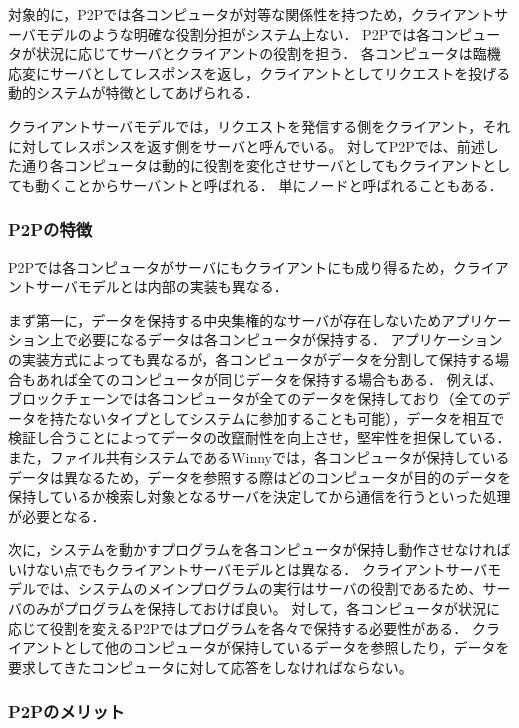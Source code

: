 対象的に，P2Pでは各コンピュータが対等な関係性を持つため，クライアントサーバモデルのような明確な役割分担がシステム上ない．
P2Pでは各コンピュータが状況に応じてサーバとクライアントの役割を担う．
各コンピュータは臨機応変にサーバとしてレスポンスを返し，クライアントとしてリクエストを投げる動的システムが特徴としてあげられる．

クライアントサーバモデルでは，リクエストを発信する側をクライアント，それに対してレスポンスを返す側をサーバと呼んでいる。
対してP2Pでは、前述した通り各コンピュータは動的に役割を変化させサーバとしてもクライアントとしても動くことからサーバントと呼ばれる．
単にノードと呼ばれることもある．

\subsubsection{P2Pの特徴}

P2Pでは各コンピュータがサーバにもクライアントにも成り得るため，クライアントサーバモデルとは内部の実装も異なる．

まず第一に，データを保持する中央集権的なサーバが存在しないためアプリケーション上で必要になるデータは各コンピュータが保持する．
アプリケーションの実装方式によっても異なるが，各コンピュータがデータを分割して保持する場合もあれば全てのコンピュータが同じデータを保持する場合もある．
例えば、ブロックチェーンでは各コンピュータが全てのデータを保持しており（全てのデータを持たないタイプとしてシステムに参加することも可能），データを相互で検証し合うことによってデータの改竄耐性を向上させ，堅牢性を担保している．
また，ファイル共有システムであるWinnyでは，各コンピュータが保持しているデータは異なるため，データを参照する際はどのコンピュータが目的のデータを保持しているか検索し対象となるサーバを決定してから通信を行うといった処理が必要となる．

次に，システムを動かすプログラムを各コンピュータが保持し動作させなければいけない点でもクライアントサーバモデルとは異なる．
クライアントサーバモデルでは、システムのメインプログラムの実行はサーバの役割であるため、サーバのみがプログラムを保持しておけば良い。
対して，各コンピュータが状況に応じて役割を変えるP2Pではプログラムを各々で保持する必要性がある．
クライアントとして他のコンピュータが保持しているデータを参照したり，データを要求してきたコンピュータに対して応答をしなければならない。

\subsubsection{P2Pのメリット}

